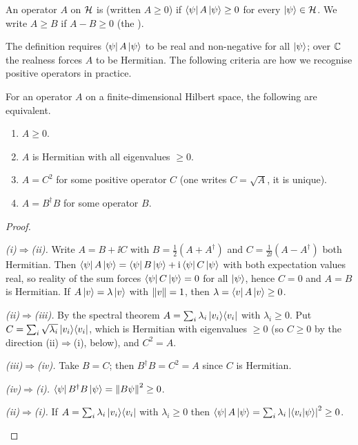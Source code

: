\begin{definition}\label{def:positive}
  An operator $A$ on $\mathcal{H}$ is  (written $A\ge0$) if $\left\langle\psi\right| A\left|\psi\right\rangle\ge0$ for every $\left|\psi\right\rangle\in\mathcal{H}$. We write $A\ge B$ if $A-B\ge0$ (the ).
\end{definition}

The definition requires $\left\langle\psi\right| A\left|\psi\right\rangle$ to be real and non-negative for all $\left|\psi\right\rangle$; over $\mathbb{C}$ the realness forces $A$ to be Hermitian. The following criteria are how we recognise positive operators in practice.

\begin{theorem}\label{thm:positive}
  For an operator $A$ on a finite-dimensional Hilbert space, the following are equivalent.
  \begin{enumerate}
    \item[(i)] $A\ge0$.
    \item[(ii)] $A$ is Hermitian with all eigenvalues $\ge0$.
    \item[(iii)] $A=C^2$ for some positive operator $C$ (one writes $C=\sqrt A$, it is unique).
    \item[(iv)] $A=B^\dagger B$ for some operator $B$.
  \end{enumerate}
\end{theorem}
\begin{proof}
  \begin{steps}
    \item \emph{(i)$\Rightarrow$(ii).} Write $A=B+\ii C$ with $B=\tfrac12(A+A^\dagger)$ and $C=\tfrac1{2\ii}(A-A^\dagger)$ both Hermitian. Then $\left\langle\psi\right| A\left|\psi\right\rangle=\left\langle\psi\right| B\left|\psi\right\rangle+\mathrm{i}\left\langle\psi\right| C\left|\psi\right\rangle$ with both expectation values real, so reality of the sum forces $\left\langle\psi\right| C\left|\psi\right\rangle=0$ for all $\left|\psi\right\rangle$, hence $C=0$ and $A=B$ is Hermitian. If $A\left|v\right\rangle=\lambda\left|v\right\rangle$ with $\left\|v\right\|=1$, then $\lambda=\left\langle v\right|A\left|v\right\rangle\ge0$.
    \item \emph{(ii)$\Rightarrow$(iii).} By the spectral theorem $A=\sum_i\lambda_i\left|v_i\right\rangle\!\left\langle v_i\right|$ with $\lambda_i\ge0$. Put $C=\sum_i\sqrt{\lambda_i}\left|v_i\right\rangle\!\left\langle v_i\right|$, which is Hermitian with eigenvalues $\ge0$ (so $C\ge0$ by the direction (ii)$\Rightarrow$(i), below), and $C^2=A$.
    \item \emph{(iii)$\Rightarrow$(iv).} Take $B=C$; then $B^\dagger B=C^2=A$ since $C$ is Hermitian.
    \item \emph{(iv)$\Rightarrow$(i).} $\left\langle\psi\right| B^\dagger B\left|\psi\right\rangle=\left\|B\psi\right\|^2\ge0$.
    \item \emph{(ii)$\Rightarrow$(i).} If $A=\sum_i\lambda_i\left|v_i\right\rangle\!\left\langle v_i\right|$ with $\lambda_i\ge0$ then $\left\langle\psi\right| A\left|\psi\right\rangle=\sum_i\lambda_i\left|\left\langle v_i\middle|\psi\right\rangle\right|^2\ge0$. \qedhere
  \end{steps}
\end{proof}

